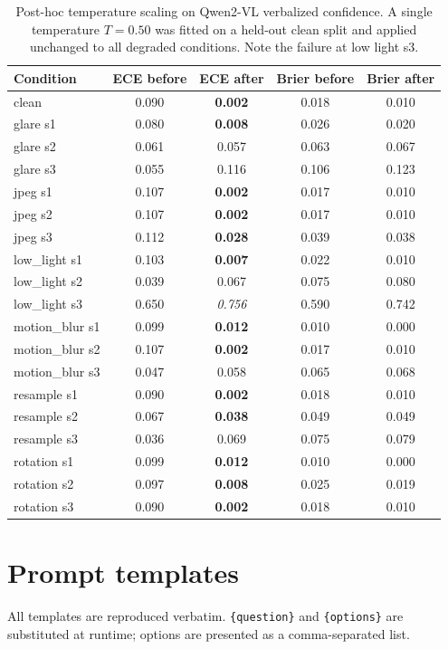 \documentclass[11pt]{article}
\begin{document}
\clearpage

\begin{table}[h]
\centering
\small
\caption{Post-hoc temperature scaling on Qwen2-VL verbalized confidence.
A single temperature $T=0.50$ was fitted on a held-out clean split and applied
unchanged to all degraded conditions. Note the failure at low light s3.}
\label{tab:appendix-temp}
\begin{tabular}{lcccc}
\toprule
Condition & ECE before & ECE after & Brier before & Brier after \\
\midrule
clean            & 0.090 & \textbf{0.002} & 0.018 & 0.010 \\
glare s1         & 0.080 & \textbf{0.008} & 0.026 & 0.020 \\
glare s2         & 0.061 & 0.057 & 0.063 & 0.067 \\
glare s3         & 0.055 & 0.116 & 0.106 & 0.123 \\
jpeg s1          & 0.107 & \textbf{0.002} & 0.017 & 0.010 \\
jpeg s2          & 0.107 & \textbf{0.002} & 0.017 & 0.010 \\
jpeg s3          & 0.112 & \textbf{0.028} & 0.039 & 0.038 \\
low\_light s1    & 0.103 & \textbf{0.007} & 0.022 & 0.010 \\
low\_light s2    & 0.039 & 0.067 & 0.075 & 0.080 \\
low\_light s3    & 0.650 & \emph{0.756} & 0.590 & 0.742 \\
motion\_blur s1  & 0.099 & \textbf{0.012} & 0.010 & 0.000 \\
motion\_blur s2  & 0.107 & \textbf{0.002} & 0.017 & 0.010 \\
motion\_blur s3  & 0.047 & 0.058 & 0.065 & 0.068 \\
resample s1      & 0.090 & \textbf{0.002} & 0.018 & 0.010 \\
resample s2      & 0.067 & \textbf{0.038} & 0.049 & 0.049 \\
resample s3      & 0.036 & 0.069 & 0.075 & 0.079 \\
rotation s1      & 0.099 & \textbf{0.012} & 0.010 & 0.000 \\
rotation s2      & 0.097 & \textbf{0.008} & 0.025 & 0.019 \\
rotation s3      & 0.090 & \textbf{0.002} & 0.018 & 0.010 \\
\bottomrule
\end{tabular}
\end{table}

\section{Prompt templates}
\label{app:prompts}
All templates are reproduced verbatim. \texttt{\{question\}} and
\texttt{\{options\}} are substituted at runtime; options are presented as a
comma-separated list.
\end{document}
